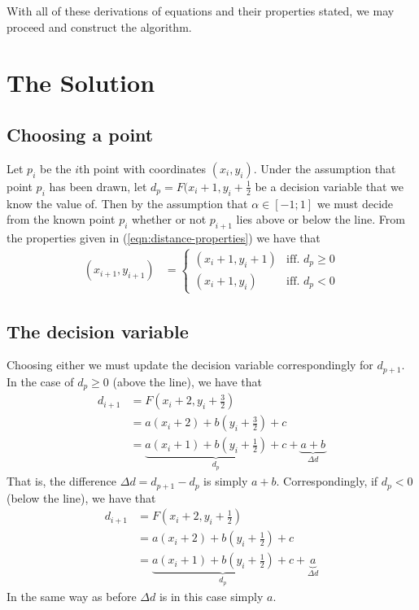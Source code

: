 \documentclass[11pt]{article}
\begin{document}
With all of these derivations of equations and their properties stated, we may
proceed and construct the algorithm.

\section{The Solution}
\subsection{Choosing a point}
Let $p_i$ be the $i$th point with coordinates $(x_i, y_i)$. Under the
assumption that point $p_i$ has been drawn, let $d_p = F(x_i + 1, y_i +
\frac{1}{2}$ be a decision variable that we know the value of. Then by the
assumption that $\alpha \in [-1;1]$ we must decide from the known point $p_i$
whether or not $p_{i + 1}$ lies above or below the line. From the properties
given in (\ref{eqn:distance-properties}) we have that
\begin{align}
    (x_{i + 1}, y_{i + 1}) &=
    \begin{cases}
        (x_i + 1, y_i + 1) &\mbox{iff. $d_p \geq 0$} \\
        (x_i + 1, y_i) &\mbox{iff. $d_p < 0$}
    \end{cases}
\end{align} 

\subsection{The decision variable}
Choosing either we must update the decision variable correspondingly for
$d_{p + 1}$. In the case of $d_p \geq 0$ (above the line), we have that
\begin{align}
    d_{i + 1}
    &= F(x_i + 2, y_i + \frac{3}{2}) \\
    &= a(x_i + 2) + b(y_i + \frac{3}{2}) + c \\
    &= \underbrace{a(x_i + 1) + b(y_i + \frac{1}{2}) + c}_{d_p}
     + \underbrace{a + b}_{\Delta d}
\end{align}
That is, the difference $\Delta d = d_{p + 1} - d_p$ is simply $a + b$.
Correspondingly, if $d_p < 0$ (below the line), we have that
\begin{align}
    d_{i + 1}
    &= F(x_i + 2, y_i + \frac{1}{2}) \\
    &= a(x_i + 2) + b(y_i + \frac{1}{2}) + c \\
    &= \underbrace{a(x_i + 1) + b(y_i + \frac{1}{2}) + c}_{d_p}
     + \underbrace{a}_{\Delta d}
\end{align}
In the same way as before $\Delta d$ is in this case simply $a$.
\end{document}
